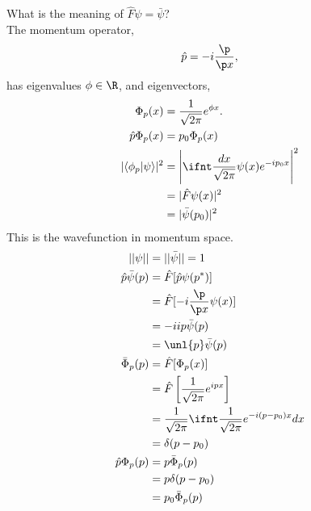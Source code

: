 \documentclass[cplx.tex]{subfiles}
\begin{document}
What is the meaning of $\hat{F}\psi = \bar{\psi}$?\\
The momentum operator, 
\begin{equation}
    \hat{p} = -i\frac{\p}{\p x},
\end{equation}
has eigenvalues $\phi \in \R$, and eigenvectors,
\begin{align}
    \Phi_p(x) &= \frac{1}{\sqrt{2\pi}} e^{\phi x}.\\
    \hat{p}\Phi_p(x) &= p_0\Phi_p(x) \\
    |\langle\phi_p|\psi\rangle|^2 &= \Bigg|\ifnt \frac{dx}{\sqrt{2\pi}} \psi(x)e^{-ip_0x}\Bigg|^2\\
                                  &= |\hat{F}\psi(x)|^2 \\
                                  &= |\bar{\psi}(p_0)|^2
\end{align}
This is the wavefunction in momentum space.
\begin{align}
    ||\psi|| &= ||\bar{\psi}|| = 1 \\
    \hat{p}\bar{\psi}(p) &= \hat{F}[\hat{p}\psi(p^*)] \\
                         &= \hat{F}[-i\frac{\p}{\p x} \psi(x)] \\
                         &= -iip\bar{\psi}(p) \\
                         &= \unl{p}\bar{\psi}(p) \\
    \bar{\Phi}_p(p) &= \hat{F}[\Phi_p(x)] \\
                    &= \hat{F}\left[\frac{1}{\sqrt{2\pi}} e^{ipx}\right] \\
                    &= \frac{1}{\sqrt{2\pi}} \ifnt \frac{1}{\sqrt{2\pi}} e^{-i(p-p_0)x}dx \\
                    &= \delta(p-p_0)\\
    \hat{p}\Phi_p(p) &= p\bar{\Phi}_p(p) \\
                       &= p\delta(p-p_0)\\
                       &= p_0\bar{\Phi}_p(p)
\end{align}
\end{document}
